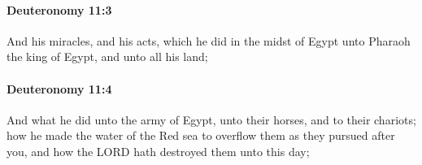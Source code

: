 		\paragraph{Deuteronomy 11:3} %
			\label{DEUTERONOMY-11-3}

			And his miracles, and his acts, which he did in the midst of Egypt unto Pharaoh the king of Egypt, and unto all his land;


		\paragraph{Deuteronomy 11:4} %
			\label{DEUTERONOMY-11-4}

			And what he did unto the army of Egypt, unto their horses, and to their chariots; how he made the water of the Red sea to overflow them as they pursued after you, and how the LORD hath destroyed them unto this day;


